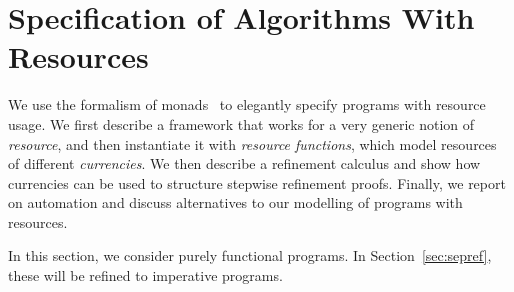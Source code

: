 \documentclass[acmsmall]{acmart}
\begin{document}







\section{Specification of Algorithms With Resources} \label{sec:algo-resource}

We use the formalism of monads~\cite{Wadler90} to elegantly specify programs with resource usage. 
We first describe a framework that works for a very generic notion of \emph{resource}, and then instantiate it with 
\emph{resource functions}, which model resources of 
different \emph{currencies}. We then describe a refinement calculus and show how currencies can be used to structure stepwise refinement proofs.
Finally, we report on automation and discuss alternatives to our modelling of programs with resources.

In this section, we consider purely functional programs. 
In Section~\ref{sec:sepref}, these will be refined to imperative programs.



\end{document}
